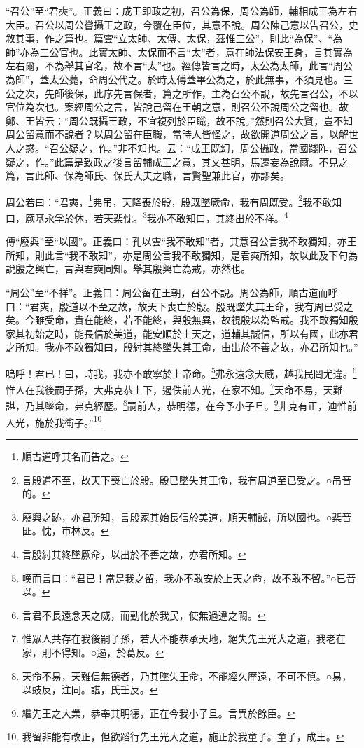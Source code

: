 {\noindent\shu{}\fzkt “召公”至“君奭”。正義曰：成王即政之初，召公為保，周公為師，輔相成王為左右大臣。召公以周公嘗攝王之政，今覆在臣位，其意不說。周公陳己意以告召公，史敘其事，作之篇也。篇雲“立太師、太傅、太保，茲惟三公”，則此“為保”、“為師”亦為三公官也。此實太師、太保而不言“太”者，意在師法保安王身，言其實為左右爾，不為舉其官名，故不言“太”也。經傳皆言之時，太公為太師，此言“周公為師”，蓋太公薨，命周公代之。於時太傅蓋畢公為之，於此無事，不須見也。三公之次，先師後保，此序先言保者，篇之所作，主為召公不說，故先言召公，不以官位為次也。案經周公之言，皆說己留在王朝之意，則召公不說周公之留也。故鄭、王皆云：“周公既攝王政，不宜複列於臣職，故不說。”然則召公大賢，豈不知周公留意而不說者？以周公留在臣職，當時人皆怪之，故欲開道周公之言，以解世人之惑。“召公疑之，作。”非不知也。云：“成王既幻，周公攝政，當國踐阼，召公疑之，作。”此篇是致政之後言留輔成王之意，其文甚明，馬遷妄為說爾。不見之篇，言此師、保為師氏、保氏大夫之職，言賢聖兼此官，亦謬矣。 \par}

周公若曰：“君奭，\footnote{順古道呼其名而告之。}弗吊，天降喪於殷，殷既墜厥命，我有周既受。\footnote{言殷道不至，故天下喪亡於殷。殷已墜失其王命，我有周道至已受之。○吊音的。}我不敢知曰，厥基永孚於休，若天棐忱。\footnote{廢興之跡，亦君所知，言殷家其始長信於美道，順天輔誠，所以國也。○棐音匪。忱，市林反。}我亦不敢知曰，其終出於不祥。\footnote{言殷紂其終墜厥命，以出於不善之故，亦君所知。}


{\noindent\zhuan{}\fzbyks 傳“廢興”至“以國”。正義曰：孔以雲“我不敢知”者，其意召公言我不敢獨知，亦王所知，則此言“我不敢知”，亦是周公言我不敢獨知，是君奭所知，故以此及下句為說殷之興亡，言與君奭同知。舉其殷興亡為戒，亦然也。 \par}

{\noindent\shu{}\fzkt “周公”至“不祥”。正義曰：周公留在王朝，召公不說。周公為師，順古道而呼曰：“君奭，殷道以不至之故，故天下喪亡於殷。殷既墜失其王命，我有周已受之矣。今雖受命，貴在能終，若不能終，與殷無異，故視殷以為監戒。我不敢獨知殷家其初始之時，能長信於美道，能安順於上天之，道輔其誠信，所以有國，此亦君之所知。我亦不敢獨知曰，殷紂其終墜失其王命，由出於不善之故，亦君所知也。” \par}

嗚呼！君已！曰，時我，我亦不敢寧於上帝命。\footnote{嘆而言曰：“君已！當是我之留，我亦不敢安於上天之命，故不敢不留。”○已音以。}弗永遠念天威，越我民罔尤違。\footnote{言君不長遠念天之威，而勤化於我民，使無過違之闕。}惟人在我後嗣子孫，大弗克恭上下，遏佚前人光，在家不知。\footnote{惟眾人共存在我後嗣子孫，若大不能恭承天地，絕失先王光大之道，我老在家，則不得知。○遏，於葛反。}天命不易，天難諶，乃其墜命，弗克經歷。\footnote{天命不易，天難信無德者，乃其墜失王命，不能經久歷遠，不可不慎。○易，以豉反，注同。諶，氏壬反。}嗣前人，恭明德，在今予小子旦。\footnote{繼先王之大業，恭奉其明德，正在今我小子旦。言異於餘臣。}非克有正，迪惟前人光，施於我衝子。”\footnote{我留非能有改正，但欲蹈行先王光大之道，施正於我童子。童子，成王。}


